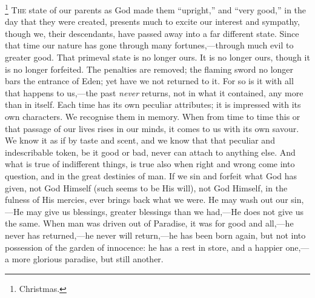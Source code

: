 \footnote{Christmas.} T\textsc{he} state of our
parents as God made them ``upright,'' and ``very
good,'' in the day that they were created, presents much to excite
our interest and sympathy, though we, their descendants, have passed
away into a far different state. Since that time our nature has gone
through many fortunes,—through much evil to greater good. That
primeval state is no longer ours. It is no longer ours, though it is
no longer forfeited. The penalties are removed; the flaming sword no
longer bars the entrance of Eden; yet have we not returned to it. For
so is it with all that happens to us,—the past \emph{never} returns,
not in what it contained, any more than in itself. Each time has its
own peculiar attributes; it is impressed with its own characters. We
recognise them in memory. When from time to time this or that passage
of our lives rises in our minds, it comes to us with its own savour.
We know it as if by taste and scent, and we know that that peculiar
and indescribable token, be it good or bad, never can attach to
anything else. And what is true of indifferent things, is true also
when right and wrong come into question, and in the great destinies of
man. If we sin and forfeit what God has given, not God Himself (such
seems to be His will), not God Himself, in the fulness of His mercies,
ever brings back what we were. He may wash out our sin,—He may give
us blessings, greater blessings than we had,—He does not give us the
same. When man was driven out of Paradise, it was for good and all,—he
never has returned,—he never will return,—he has been born again,
but not into possession of the garden of innocence: he has a rest in
store, and a happier one,—a more glorious paradise, but still
another.

